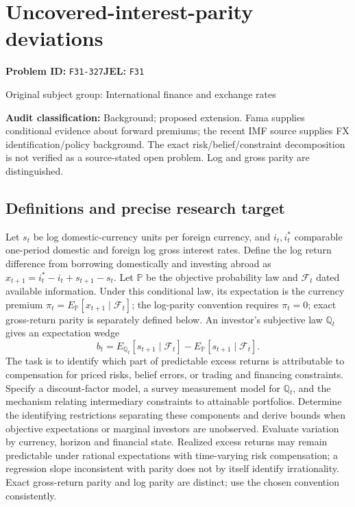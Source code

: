 \documentclass[11pt,a4paper]{article}
\begin{document}
\section*{Uncovered-interest-parity deviations}
\textbf{Problem ID:} \texttt{F31-327}\quad \textbf{JEL:} \texttt{F31}\par
\label{problem:OP-0332}
{\sffamily\small\color{muted}Original subject group: International finance and exchange rates\par}
\label{definitions:problem:30007614}
\textbf{Audit classification:} Background; proposed extension. Fama supplies conditional evidence about forward premiums; the recent IMF source supplies FX identification/policy background. The exact risk/belief/constraint decomposition is not verified as a source-stated open problem. Log and gross parity are distinguished.
\subsection*{Definitions and precise research target}
Let \(s_t\) be log domestic-currency units per foreign currency, and \(i_t,i_t^*\) comparable one-period domestic and foreign log gross interest rates. Define the log return difference from borrowing domestically and investing abroad as \(x_{t+1}=i_t^*-i_t+s_{t+1}-s_t\). Let \(\mathbb P\) be the objective probability law and \(\mathcal F_t\) dated available information. Under this conditional law, its expectation is the currency premium \(\pi_t=E_{\mathbb P}[x_{t+1}\mid\mathcal F_t]\); the log-parity convention requires \(\pi_t=0\); exact gross-return parity is separately defined below. An investor's subjective law \(\mathbb Q_t\) gives an expectation wedge
\[b_t=E_{\mathbb Q_t}[s_{t+1}\mid\mathcal F_t]-E_{\mathbb P}[s_{t+1}\mid\mathcal F_t].\]
The task is to identify which part of predictable excess returns is attributable to compensation for priced risks, belief errors, or trading and financing constraints. Specify a discount-factor model, a survey measurement model for \(\mathbb Q_t\), and the mechanism relating intermediary constraints to attainable portfolios. Determine the identifying restrictions separating these components and derive bounds when objective expectations or marginal investors are unobserved. Evaluate variation by currency, horizon and financial state. Realized excess returns may remain predictable under rational expectations with time-varying risk compensation; a regression slope inconsistent with parity does not by itself identify irrationality. Exact gross-return parity and log parity are distinct; use the chosen convention consistently.
\end{document}
